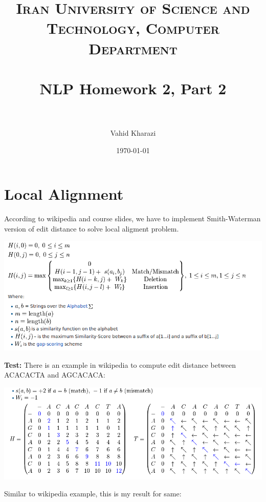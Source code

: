\documentclass[paper=a4, fontsize=11pt]{scrartcl} %
\title{ 
\normalfont \normalsize 
\textsc{Iran University of Science and Technology, Computer Department} \\ [25pt] %
\horrule{0.5pt} \\[0.4cm] %
\huge NLP Homework 2, Part 2 \\ %
\horrule{2pt} \\[0.5cm] %
}
\author{Vahid Kharazi} %
\date{\normalsize\today} %
\numberwithin{equation}{section} %
\numberwithin{figure}{section} %
\numberwithin{table}{section} %
\begin{document}
\maketitle %


\section{Local Alignment}

According to wikipedia and course slides, we have to implement Smith-Waterman version of edit distance to solve local aligment problem.

\includegraphics[scale=0.5]{smith.png}
\centering



\textbf{Test:} There is an example in wikipedia to compute edit distance between ACACACTA and AGCACACA:

\includegraphics[scale=0.5]{example.png}
\centering

\begin{flushleft}
Similar to wikipedia example, this is my result for same:

\end{flushleft}
\end{document}
